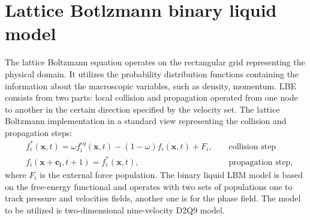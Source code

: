 \documentclass{article}
\begin{document}
\section{Lattice Botlzmann binary liquid model}
The lattice Boltzmann equation operates on the rectangular grid representing the
physical domain. It utilizes the
probability distribution functions containing the information about the
macroscopic variables, such as density,
momentum. LBE consists from two parts: local collision and propagation operated
from one node to another in the certain
direction specified by the velocity set.  The lattice Boltzmann implementation
in a standard view representing the
collision and propagation steps:
\begin{equation}
\label{standard:implementation}
\begin{aligned}
&f_i^{*}(\bm{x},t)=\omega f_i^{eq}(\bm{x},t)-(1-\omega) f_i(\bm{x},t) +
F_i,&&\text{ collision step}\\
&f_i(\bm{x}+\bm{c_i},t+1)=f_i^{*}(\bm{x},t),&&\text{ propagation step}, 
\end{aligned}
\end{equation}
where $F_i$ is the external force population. The binary liquid LBM model is
based on the free-energy functional \cite{swift,landau} and operates with two
sets of populations one to track pressure and velocities fields, another one is
for the phase field. The model to be utilized is two-dimensional nine-velocity
D2Q9 model.
\end{document}
